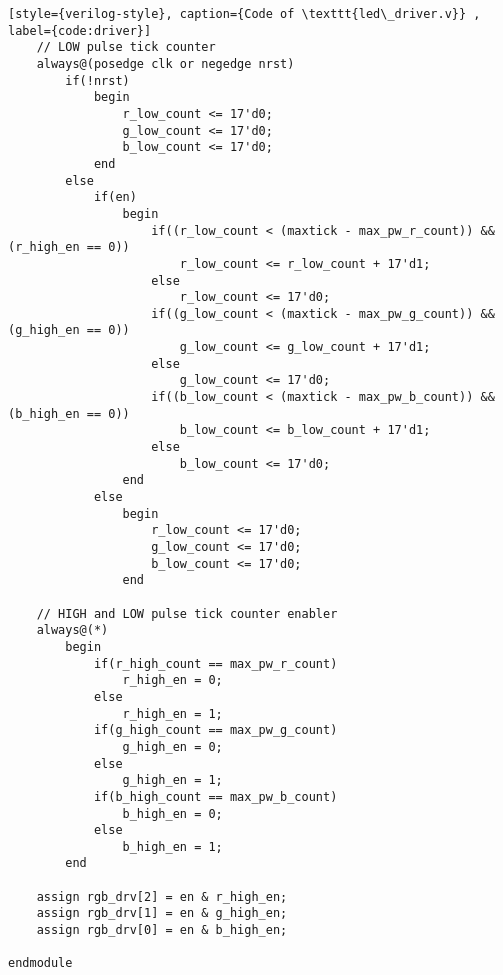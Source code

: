 \begin{lstlisting}[style={verilog-style}, caption={Code of \texttt{led\_driver.v}} , label={code:driver}]
    // LOW pulse tick counter
    always@(posedge clk or negedge nrst)
        if(!nrst)
            begin
                r_low_count <= 17'd0;
                g_low_count <= 17'd0;
                b_low_count <= 17'd0;
            end
        else
            if(en)
                begin
                    if((r_low_count < (maxtick - max_pw_r_count)) && (r_high_en == 0))
                        r_low_count <= r_low_count + 17'd1;
                    else
                        r_low_count <= 17'd0;
                    if((g_low_count < (maxtick - max_pw_g_count)) && (g_high_en == 0))
                        g_low_count <= g_low_count + 17'd1;
                    else
                        g_low_count <= 17'd0;
                    if((b_low_count < (maxtick - max_pw_b_count)) && (b_high_en == 0))
                        b_low_count <= b_low_count + 17'd1;
                    else
                        b_low_count <= 17'd0;
                end
            else
                begin
                    r_low_count <= 17'd0;
                    g_low_count <= 17'd0;
                    b_low_count <= 17'd0;
                end

    // HIGH and LOW pulse tick counter enabler
    always@(*)
        begin
            if(r_high_count == max_pw_r_count)
                r_high_en = 0;
            else
                r_high_en = 1;
            if(g_high_count == max_pw_g_count)
                g_high_en = 0;
            else
                g_high_en = 1;
            if(b_high_count == max_pw_b_count)
                b_high_en = 0;
            else
                b_high_en = 1;
        end

    assign rgb_drv[2] = en & r_high_en;
    assign rgb_drv[1] = en & g_high_en;
    assign rgb_drv[0] = en & b_high_en;

endmodule
\end{lstlisting}